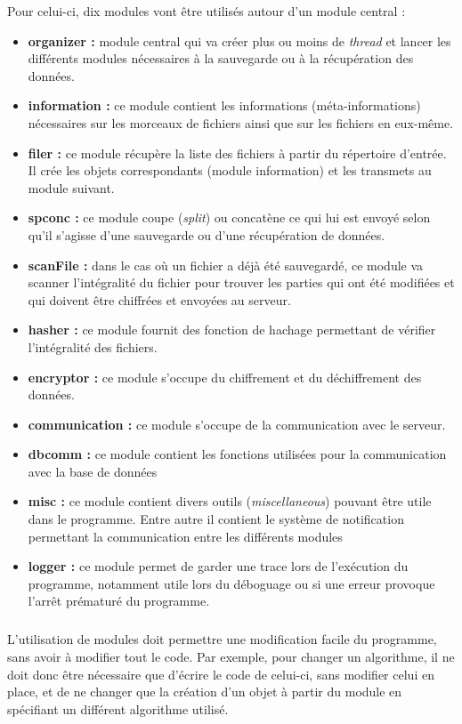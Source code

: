 \documentclass[a4paper,10pt, twoside]{report}
\begin{document}
\begin{spacing}{1.2}
Pour celui-ci, dix modules vont \^etre utilis\'es autour d'un module central :
\begin{itemize}
  \item \textbf{organizer :} module central qui va cr\'eer plus ou moins de
  \textit{thread} et lancer les diff\'erents modules n\'ecessaires \`a la
  sauvegarde ou \`a la r\'ecup\'eration des donn\'ees.
  \item \textbf{information :} ce module contient les informations
  (m\'eta-informations) n\'ecessaires sur les morceaux de fichiers ainsi que
  sur les fichiers en eux-m\^eme.
  \item \textbf{filer :} ce module r\'ecup\`ere la liste des fichiers \`a
  partir du r\'epertoire d'entr\'ee. Il cr\'ee les objets correspondants
  (module information) et les transmets au module suivant.
  \item \textbf{spconc :} ce module coupe (\textit{split}) ou concat\`ene ce
  qui lui est envoy\'e selon qu'il s'agisse d'une sauvegarde ou d'une
  r\'ecup\'eration de donn\'ees.
  \item \textbf{scanFile :} dans le cas o\`u un fichier a d\'ej\`a \'et\'e
  sauvegard\'e, ce module va scanner l'int\'egralit\'e du fichier pour trouver
  les parties qui ont \'et\'e modifi\'ees et qui doivent \^etre chiffr\'ees et
  envoy\'ees au serveur.
  \item \textbf{hasher :} ce module fournit des fonction de hachage permettant
  de v\'erifier l'int\'egralit\'e des fichiers.
  \item \textbf{encryptor :} ce module s'occupe du chiffrement et du
  d\'echiffrement des donn\'ees.
  \item \textbf{communication :} ce module s'occupe de la communication avec
  le serveur.
  \item \textbf{dbcomm :} ce module contient les fonctions utilis\'ees pour la
  communication avec la base de donn\'ees
  \item \textbf{misc :} ce module contient divers outils
  (\textit{miscellaneous}) pouvant \^etre utile dans le programme. Entre autre
  il contient le syst\`eme de notification permettant la communication entre
  les diff\'erents modules
  \item \textbf{logger :} ce module permet de garder une trace lors de
  l'ex\'ecution du programme, notamment utile lors du d\'eboguage ou si une
  erreur provoque l'arr\^et pr\'ematur\'e du programme.
\end{itemize}

\subparagraph{}
L'utilisation de modules doit permettre une modification facile du programme,
sans avoir \`a modifier tout le code. Par exemple, pour changer un algorithme,
il ne doit donc \^etre n\'ecessaire que d'\'ecrire le code de celui-ci, sans
modifier celui en place, et de ne changer que la cr\'eation d'un objet \`a
partir du module en sp\'ecifiant un diff\'erent algorithme utilis\'e.


\end{spacing}
\end{document}
